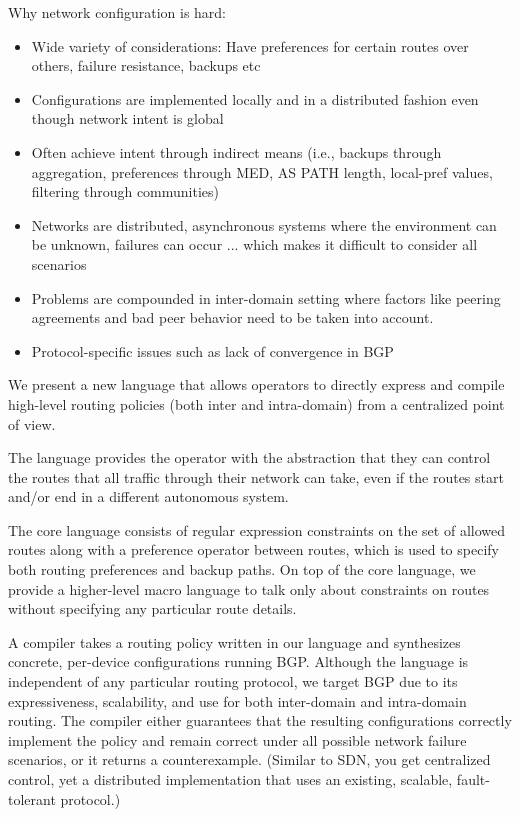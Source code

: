 \documentclass{paper}
\begin{document}
Why network configuration is hard:
\begin{itemize}
	\item Wide variety of considerations: Have preferences for certain routes over others, failure resistance, backups etc
	\item Configurations are implemented locally and in a distributed fashion even though network intent is global
	\item Often achieve intent through indirect means (i.e., backups through aggregation, preferences through MED, AS PATH length, local-pref values, filtering through communities)
	\item Networks are distributed, asynchronous systems where the environment can be unknown, failures can occur ... which makes it difficult to consider all scenarios
	\item Problems are compounded in inter-domain setting where factors like peering agreements and bad peer behavior need to be taken into account.
	\item Protocol-specific issues such as lack of convergence in BGP
\end{itemize}

We present a new language that allows operators to directly express and compile high-level routing policies (both inter and intra-domain) from a centralized point of view.

The language provides the operator with the abstraction that they can control the routes that all traffic through their network can take, even if the routes start and/or end in a different autonomous system.

The core language consists of regular expression constraints on the set of allowed routes along with a preference operator between routes, which is used to specify both routing preferences and backup paths.
On top of the core language, we provide a higher-level macro language to talk only about constraints on routes without specifying any particular route details.
	
A compiler takes a routing policy written in our language and synthesizes concrete, per-device configurations running BGP. Although the language is independent of any particular routing protocol, we target BGP due to its expressiveness, scalability, and use for both inter-domain and intra-domain routing.
The compiler either guarantees that the resulting configurations correctly implement the policy and remain correct under all possible network failure scenarios, or it returns a counterexample.
(Similar to SDN, you get centralized control, yet a distributed implementation that uses an existing, scalable, fault-tolerant protocol.)
\end{document}
